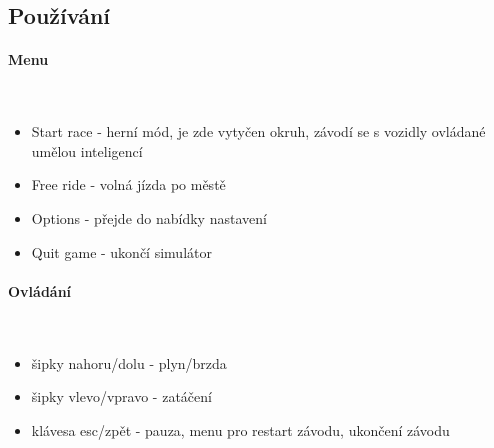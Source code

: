\documentclass[11pt,twoside,a4paper]{book}
\begin{document}
\subsection{Používání}
\paragraph{Menu}\ \ \\
\begin{itemize}
\item Start race - herní mód, je zde vytyčen okruh, závodí se s vozidly ovládané umělou inteligencí
\item Free ride - volná jízda po městě
\item Options - přejde do nabídky nastavení
\item Quit game - ukončí simulátor
\end{itemize}

\paragraph{Ovládání}\ \ \\
\begin{itemize}
\item šipky nahoru/dolu - plyn/brzda
\item šipky vlevo/vpravo - zatáčení
\item klávesa esc/zpět - pauza, menu pro restart závodu, ukončení závodu
\end{itemize}
\end{document}
